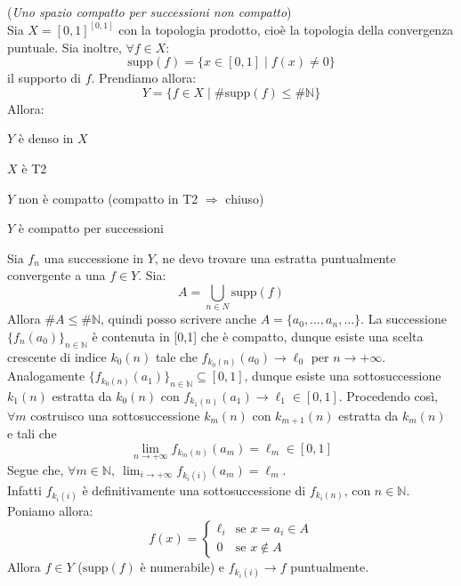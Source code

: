 \begin{ex}(\emph{Uno spazio compatto per successioni non compatto})\\
Sia $X=[0,1]^{[0,1]}$ con la topologia prodotto, cioè la topologia della convergenza puntuale. Sia inoltre, $\forall f \in X$:
$$\text{supp}(f)=\{x \in [0,1] \mid f(x) \neq 0\}$$
il supporto di $f$. Prendiamo allora:
$$Y=\{f \in X \mid \#\text{supp}(f) \le \#\mathbb{N}\}$$
Allora:
\begin{nlist}
\item $Y$ è denso in $X$
\item $X$ è T2
\item $Y$ non è compatto (compatto in T2 $\Rightarrow$ chiuso)
\item $Y$ è compatto per successioni
\end{nlist}
Sia $f_n$ una successione in $Y$, ne devo trovare una estratta puntualmente convergente a una $f \in Y$. Sia:
$$A=\bigcup _{n \in N} \text{supp}(f)$$
Allora $\#A \le \#\mathbb{N}$, quindi posso scrivere anche $A=\{a_0,\dots,a_n,\dots\}$. La successione $\{f_n(a_0)\}_{n \in \mathbb{N}}$ è contenuta in [0,1] che è compatto, dunque esiste una scelta crescente di indice $k_0(n)$ tale che $f_{k_0(n)} (a_0) \longrightarrow \ell _0$ per $n \longrightarrow +\infty$.\\
Analogamente $\{f_{k_0(n)}(a_1)\}_{n \in \mathbb{N}} \subseteq [0,1]$, dunque esiste una sottosuccessione $k_1(n)$ estratta da $k_0(n)$ con $f_{k_1(n)}(a_1) \longrightarrow \ell _1 \in [0,1]$. Procedendo così, $\forall m$ costruisco una sottosuccessione $k_m(n)$ con $k_{m+1}(n)$ estratta da $k_m(n)$ e tali che
$$\lim _{n \rightarrow +\infty} f_{k_m(n)}(a_m)=\ell _m \in [0,1]$$
Segue che, $\forall m \in \mathbb{N},\ \displaystyle \lim _{i \rightarrow +\infty} f_{k_i(i)} (a_m)=\ell _m$.\\
Infatti $f_{k_i(i)}$ è definitivamente una sottosuccessione di $f_{k_i(n)}$, con $n \in \mathbb{N}$. Poniamo allora:
$$f(x)=\begin{cases} \ell _i & \mbox{se }x=a_i \in A \\ 0 & \mbox{se }x \notin A \end{cases}$$
Allora $f \in Y$ ($\text{supp}(f)$ è numerabile) e $f_{k_i(i)} \longrightarrow f$ puntualmente.
\end{ex}
